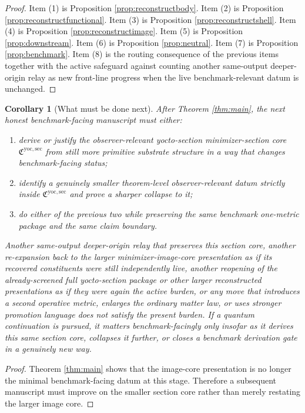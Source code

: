 \documentclass[11pt]{article}
\newcommand{\YoctoMinSectionCore}{\mathfrak C^{\mathrm{yoc,sec}}}
\newtheorem{corollary}{Corollary}
\begin{document}
\begin{proof}
Item (1) is Proposition \ref{prop:reconstructbody}. Item (2) is Proposition \ref{prop:reconstructfunctional}. Item (3) is Proposition \ref{prop:reconstructshell}. Item (4) is Proposition \ref{prop:reconstructimage}. Item (5) is Proposition \ref{prop:downstream}. Item (6) is Proposition \ref{prop:neutral}. Item (7) is Proposition \ref{prop:benchmark}. Item (8) is the routing consequence of the previous items together with the active safeguard against counting another same-output deeper-origin relay as new front-line progress when the live benchmark-relevant datum is unchanged.
\end{proof}

\begin{corollary}[What must be done next]
\label{cor:next}
After Theorem \ref{thm:main}, the next honest benchmark-facing manuscript must either:
\begin{enumerate}
    \item derive or justify the observer-relevant yocto-section minimizer-section core \(\YoctoMinSectionCore\) from still more primitive substrate structure in a way that changes benchmark-facing status;
    \item identify a genuinely smaller theorem-level observer-relevant datum strictly inside \(\YoctoMinSectionCore\) and prove a sharper collapse to it;
    \item do either of the previous two while preserving the same benchmark one-metric package and the same claim boundary.
\end{enumerate}
Another same-output deeper-origin relay that preserves this section core, another re-expansion back to the larger minimizer-image-core presentation as if its recovered constituents were still independently live, another reopening of the already-screened full yocto-section package or other larger reconstructed presentations as if they were again the active burden, or any move that introduces a second operative metric, enlarges the ordinary matter law, or uses stronger promotion language does not satisfy the present burden. If a quantum continuation is pursued, it matters benchmark-facingly only insofar as it derives this same section core, collapses it further, or closes a benchmark derivation gate in a genuinely new way.
\end{corollary}

\begin{proof}
Theorem \ref{thm:main} shows that the image-core presentation is no longer the minimal benchmark-facing datum at this stage. Therefore a subsequent manuscript must improve on the smaller section core rather than merely restating the larger image core.
\end{proof}
\end{document}
